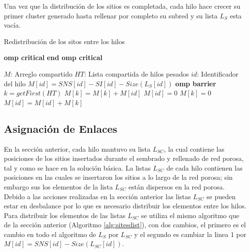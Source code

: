 Una vez que la distribución de los sitios es completada, cada hilo hace crecer su primer cluster generado hasta rellenar por completo su subred y su lista $L_S$ esta vacía.
 
\begin{algorithm}
\caption{Redistribución de los sitos entre los hilos}\label{alg:sitesdist}
\begin{algorithmic}[1]
    {\textbf{omp critical}}
    {\textbf{end omp critical}}
    
\Require $M$: Arreglo compartido
\Require $HT$: Lista compartida de hilos pesados
\Require $id$: Identificador del hilo
\State $M[id]=SNS[id]-SI[id]-Size(L_S[id])$
	\ompcritical
		\State {}
	\eompcritical
\EndIf
\State \textbf{omp barrier}
	\ompcritical
			\State $k=getFirst(HT)$
				\State {}
				\State $M[k]=M[k]+M[id]$
				\State $M[id]=0$
			\Else
				\State {}
				\State $M[k]=0$
				\State $M[id]=M[id]+M[k]$
				\State {}	
			\EndIf
		\EndWhile
	\eompcritical
\EndIf
\end{algorithmic}
\end{algorithm}

\subsection{Asignación de Enlaces}
\label{subsec:pbond}
En la sección anterior, cada hilo mantuvo su lista $L_{SC}$, la cual contiene las posiciones de los sitios insertados durante el sembrado y rellenado de red porosa, tal y como se hace en la solución básica. La listas $L_{SC}$ de cada hilo contienen las posiciones en las cuales se insertaron los sitios a lo largo de la red porosa; sin embargo sus los elementos de la lista $L_{SC}$ están dispersos en la red porosa.\\

Debido a las acciones realizadas en la sección anterior las listas $L_{SC}$ se pueden estar en desbalance por lo que es necesario distribuir los elementos entre los hilos. Para distribuir los elementos de las listas $L_{SC}$ se utiliza el mismo algoritmo que de la sección anterior (Algoritmo \ref{alg:sitesdist}), con dos cambios, el primero es el cambio en todo el algoritmo de $L_S$ por $L_{SC}$ y el segundo es cambiar la linea 1 por $M[id]=SNS[id]-Size(L_{SC}[id])$.\\

